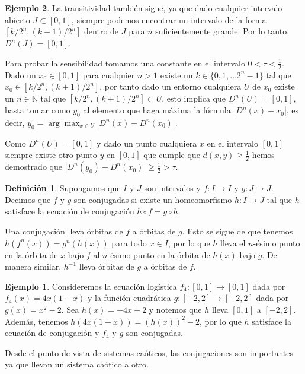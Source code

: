 \documentclass[12pt,a4paper]{report}
\theoremstyle{definition}
\newtheorem{ejemplo}{Ejemplo}[section]
\newtheorem{definicion}{Definición}[section]
\begin{document}
\begin{ejemplo}
La transitividad también sigue, ya que dado cualquier intervalo abierto $ J \subset [0,1]$, siempre podemos encontrar un intervalo de la forma $[k/2^n, (k+1)/2^n]$ dentro de $ J $ para $ n $ suficientemente grande. Por lo tanto, $ D^n(J)  = [0,1]$. 

Para probar la sensibilidad tomamos una constante en el intervalo $ 0 < \tau < \frac{1}{2}$. Dado un $x_0 \in [0,1]$
para cualquier $n > 1$ existe un $k \in \{0, 1 , \ldots 2^n - 1 \}$ tal que $x_0 \in [k/2^n, (k+1)/2^n]$, por tanto dado un entorno cualquiera $U$ de $x_0$ existe un $n \in \mathbb{N}$ tal que $[k/2^n, (k+1)/2^n] \subset U$, esto implica que $ D^n(U)  = [0,1]$, basta tomar como $y_0$ al elemento que haga máxima la fórmula $\left| D^n(x) - x_0\right| $, es decir, $y_0 = \arg\max_{x \in U} \left| D^n(x) - D^n(x_0)\right| $.

Como $ D^n(U)  = [0,1]$ y dado un punto cualquiera $x$ en el intervalo $[0,1]$ siempre existe otro punto $y$ en $[0,1]$ que cumple que $d(x,y) \geq \frac{1}{2}$ hemos demostrado que $|D^{n}(y_0) - D^{n}(x_0)| \geq \frac{1}{2} > \tau$.


\begin{definicion}
    
Supongamos que $I$ y $J$ son intervalos y $f: I \to I$ y $g: J \to J$. Decimos que $f$ y $g$ son conjugadas si existe un homeomorfismo $h: I \to J$ tal que $h$ satisface la ecuación de conjugación $h \circ f = g \circ h$.

\end{definicion}

Una conjugación lleva órbitas de $f$ a órbitas de $g$. Esto se sigue de que tenemos $h(f^n(x)) = g^n(h(x))$ para todo $x \in I$, por lo que $h$ lleva el $n$-ésimo punto en la órbita de $x$ bajo $f$ al $n$-ésimo punto en la órbita de $h(x)$ bajo $g$. De manera similar, $h^{-1}$ lleva órbitas de $g$ a órbitas de $f$.


\begin{ejemplo}
    
Consideremos la ecuación logística $f_4: [0,1] \to [0,1]$ dada por $f_4(x) = 4x(1-x)$ y la función cuadrática $g: [-2,2] \to [-2,2]$ dada por $g(x) = x^2 - 2$. Sea $h(x) = -4x + 2$ y notemos que $h$ lleva $[0,1]$ a $[-2,2]$. Además, tenemos $h(4x(1-x)) = (h(x))^2 - 2$, por lo que $h$ satisface la ecuación de conjugación y $f_4$ y $g$ son conjugadas.

\end{ejemplo}

Desde el punto de vista de sistemas caóticos, las conjugaciones son importantes ya que llevan un sistema caótico a otro.


\end{ejemplo}
\end{document}
